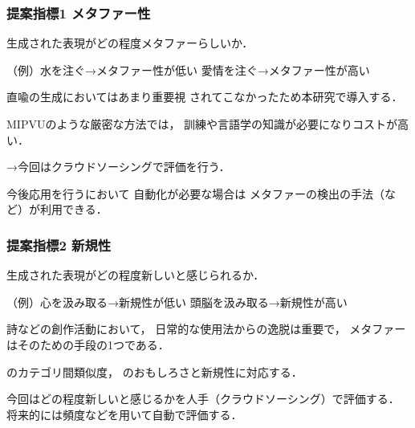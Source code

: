 \documentclass[12pt,usepdftitle=false]{beamer}
\begin{document}
\begin{frame}
    \frametitle{提案指標1 メタファー性}
    生成された表現がどの程度メタファーらしいか．

    （例）水を注ぐ→メタファー性が低い\newline
     \phantom{（例）}\hspace{0.5\zw}愛情を注ぐ→メタファー性が高い

     \bigskip

    直喩の生成においてはあまり重要視
    されてこなかったため本研究で導入する．

	\bigskip

	MIPVUのような厳密な方法では，
	訓練や言語学の知識が必要になりコストが高い．

	→今回はクラウドソーシングで評価を行う．

	\bigskip

	今後応用を行うにおいて
    自動化が必要な場合は
    メタファーの検出の手法（\citet{shutova2011}など）が利用できる．

\end{frame}

\begin{frame}
    \frametitle{提案指標2 新規性}
    生成された表現がどの程度新しいと感じられるか．

    （例）心を汲み取る→新規性が低い\newline
     \phantom{（例）}\hspace{0.5\zw}頭脳を汲み取る→新規性が高い

    \bigskip

    詩などの創作活動において，
    日常的な使用法からの逸脱は重要で，
    メタファーはそのための手段の1つである\citep{leech2014}．

    \bigskip

    \citet{jakitada2001}のカテゴリ間類似度，
    \citet{abe2006}のおもしろさと新規性に対応する．

    \bigskip

%
%
%

    今回はどの程度新しいと感じるかを人手（クラウドソーシング）で評価する．
    将来的には頻度などを用いて自動で評価する．
\end{frame}
\end{document}
